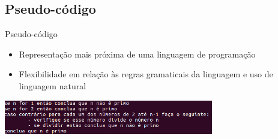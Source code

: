 \documentclass[portuguese,10pt,xcolor=table]{bredelebeamer}
\begin{document}
\subsection{Pseudo-código}
\begin{frame}

	Pseudo-código
\begin{itemize}
	\item Representação mais próxima de uma linguagem de programação
	\item Flexibilidade em relação às regras gramaticais da linguagem e uso de linguagem natural
\end{itemize}
	\includegraphics[height=1.5cm]{pseudocodigo.png}
\end{frame}

	
\end{document}
